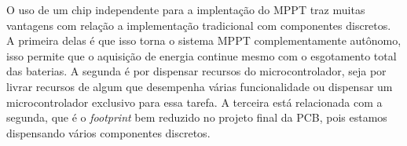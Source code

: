 O uso de um chip independente para a implentação do MPPT traz muitas vantagens com relação a implementação tradicional com componentes discretos. A primeira delas é que isso torna o sistema MPPT complementamente autônomo, isso permite que o aquisição de energia continue mesmo com o esgotamento total das baterias. A segunda é por dispensar recursos do microcontrolador, seja por livrar recursos de algum que desempenha várias funcionalidade ou dispensar um microcontrolador exclusivo para essa tarefa. A terceira está relacionada com a segunda, que é o \textit{footprint} bem reduzido no projeto final da PCB, pois estamos dispensando vários componentes discretos.




